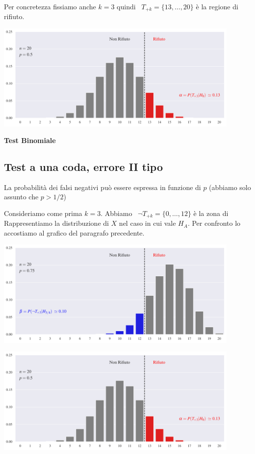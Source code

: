 \documentclass[11pt,openany]{book}
\def\emph#1{\textcolor{blue}{\textbf{\boldmath #1}}}
\renewcommand*{\emph}[1]{%
   \smash{\tikz[baseline]\node[rectangle, fill=teal!25, rounded corners, inner xsep=0.5ex, inner ysep=0.2ex, anchor=base, minimum height = 2.7ex]{#1};}}
\begin{document}
Per concretezza fissiamo anche $k=3$ quindi {\color{red}\boldmath\ $T_{+k}=\{13,\dots,20\}$} è la regione di rifiuto.  %


\hfil\includegraphics[width=0.9\textwidth]{figure/B-test_01.pdf}


\clearpage\hfill\textbf{Test Binomiale}\subsection{Test a una coda, errore II tipo}

La probabilità dei falsi negativi può essere espressa in funzione di $p$ (abbiamo solo assunto che $p>1/2$)



Consideriamo come prima $k=3$.
Abbiamo {\color{blue}\boldmath\ $\neg T_{+k}=\{0,\dots,12\}$} è la zona di \emph{NON rifiuto.}
Rappresentiamo la distribuzione di $X$ nel caso in cui vale $H_{A}$. Per confronto lo accostiamo al grafico del paragrafo precedente. 

\hfil\includegraphics[width=0.9\textwidth]{figure/B-test_02.pdf}

\hfil\includegraphics[width=0.9\textwidth]{figure/B-test_01.pdf}
\end{document}
